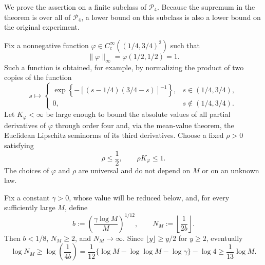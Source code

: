 We prove the assertion on a finite subclass of \(\mathcal P_4\).  Because the supremum in the theorem is over all of \(\mathcal P_4\), a lower bound on this subclass is also a lower bound on the original experiment.

Fix a nonnegative function \(\varphi\in C_c^\infty((1/4,3/4)^2)\) such that
\[
 \lVert\varphi\rVert_\infty=\varphi(1/2,1/2)=1.
\]
Such a function is obtained, for example, by normalizing the product of two copies of the function
\[
 s\longmapsto
 \begin{cases}
 \exp\!\left\{-[(s-1/4)(3/4-s)]^{-1}\right\},&s\in(1/4,3/4),\\
 0,&s\notin(1/4,3/4).
 \end{cases}
\]
Let \(K_\varphi<\infty\) be large enough to bound the absolute values of all partial derivatives of \(\varphi\) through order four and, via the mean-value theorem, the Euclidean Lipschitz seminorms of its third derivatives.  Choose a fixed \(\rho>0\) satisfying
\[
 \rho\le\frac12,
 \qquad
 \rho K_\varphi\le1.                                      \tag{1}
\]
The choices of \(\varphi\) and \(\rho\) are universal and do not depend on \(M\) or on an unknown law.

Fix a constant \(\gamma>0\), whose value will be reduced below, and, for every sufficiently large \(M\), define
\[
 b:=\left(\frac{\gamma\log M}{M}\right)^{1/12},
 \qquad
 N_M:=\left\lfloor\frac{1}{2b}\right\rfloor .             \tag{2}
\]
Then \(b<1/8\), \(N_M\ge2\), and \(N_M\to\infty\).  Since \(\lfloor y\rfloor\ge y/2\) for \(y\ge2\), eventually
\[
 \log N_M
 \ge \log\!\left(\frac{1}{4b}\right)
 =\frac1{12}\{\log M-\log\log M-\log\gamma\}-\log4
 \ge\frac1{13}\log M.                                    \tag{3}
\]

